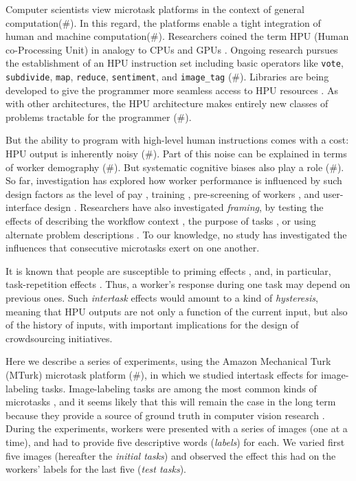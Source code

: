 \documentclass[12pt]{article}
\begin{document}
Computer scientists view microtask platforms in the context of general
computation(\#).  In this regard, the platforms enable a tight integration of 
human and machine computation(\#).  Researchers coined the term HPU 
(Human co-Processing Unit) in analogy to CPUs and GPUs \cite{5543192}.  
Ongoing research pursues the establishment of an HPU instruction set
including basic operators like \texttt{vote}, \texttt{subdivide}, \texttt{map},
\texttt{reduce}, \texttt{sentiment}, and \texttt{image\_tag} (\#).  Libraries 
are being developed to give the programmer more seamless access to HPU 
resources 
 \cite{little2010turkit,minder2011crowdlang,minder2012crowdlang,kittur2011crowdforge}.  
As with other architectures, the HPU architecture makes entirely new classes 
of problems tractable for the programmer (\#).

But the ability to program with high-level human instructions comes with a 
cost: HPU output is inherently noisy (\#).  Part of this noise can be explained
in terms of worker demography (\#).  But systematic cognitive biases also 
play a role (\#).   
So far, investigation has explored how worker performance is influenced by
such design factors as the level of 
pay \cite{kazai2013analysis}, training \cite{le2010ensuring}, pre-screening of 
workers \cite{paolacci2010running}, and user-interface design 
\cite{Finnerty2013}.  Researchers have also investigated \textit{framing}, 
by testing the effects of describing the workflow context 
\cite{Kinnaird2012281}, the purpose of tasks 
\cite{chandler2013breaking}, or using alternate problem descriptions
\cite{thibodeau2013natural}.  To our knowledge, no study has investigated 
the influences that consecutive microtasks exert on one another.

It is known that people are susceptible to priming effects 
\cite{BJOP1796,No2007,beller1971priming}, and, in particular, task-repetition 
effects \cite{Gass1999549,sohn2001task}.  Thus, a worker's response during
one task may depend on previous ones.  Such \textit{intertask} effects
would amount to a kind of \textit{hysteresis}, meaning that HPU outputs are not
only a function of the current input, but also of the history of inputs, with
important implications for the design of crowdsourcing initiatives.

Here we describe a series of experiments, using the Amazon Mechanical
Turk (MTurk) microtask platform (\#), in which we studied intertask effects
for image-labeling tasks.  Image-labeling tasks are among the most 
common kinds of microtasks
\cite{chandler2013breaking,Berinsky2012351,Finnerty2013,paolacci2010running}, 
and it seems likely that this will remain the case in the long term because
they provide a source of ground truth in computer vision research 
\cite{5543192}.  
During the experiments, workers were presented with a series of images (one at
a time), and had to provide five descriptive words (\textit{labels}) for each.
We varied first five images (hereafter the \textit{initial tasks})
and observed the effect this had on the workers' labels for the last five
(\textit{test tasks}).
\end{document}
